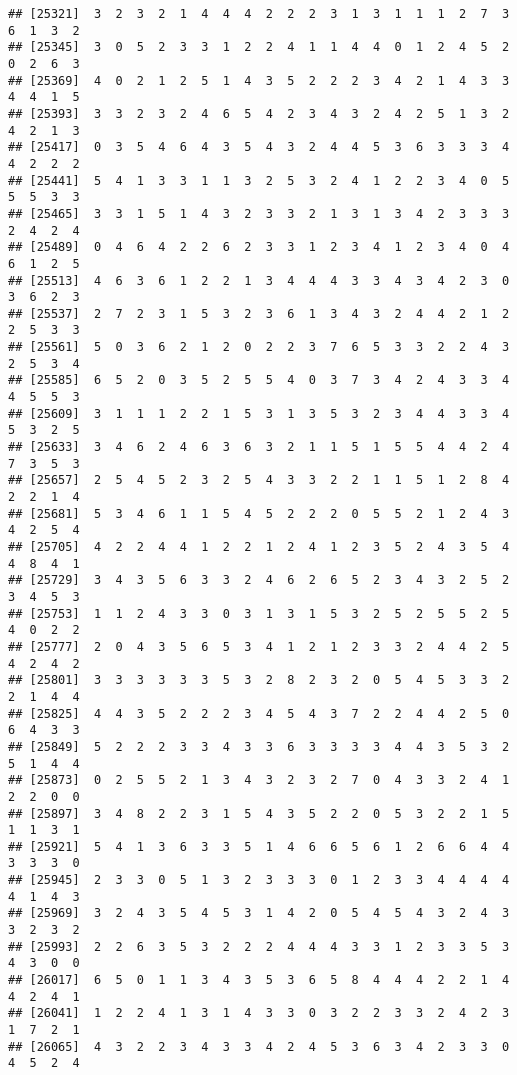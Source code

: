 \documentclass[
]{article}
\begin{document}
\begin{verbatim}
## [25321]  3  2  3  2  1  4  4  4  2  2  2  3  1  3  1  1  1  2  7  3  6  1  3  2
## [25345]  3  0  5  2  3  3  1  2  2  4  1  1  4  4  0  1  2  4  5  2  0  2  6  3
## [25369]  4  0  2  1  2  5  1  4  3  5  2  2  2  3  4  2  1  4  3  3  4  4  1  5
## [25393]  3  3  2  3  2  4  6  5  4  2  3  4  3  2  4  2  5  1  3  2  4  2  1  3
## [25417]  0  3  5  4  6  4  3  5  4  3  2  4  4  5  3  6  3  3  3  4  4  2  2  2
## [25441]  5  4  1  3  3  1  1  3  2  5  3  2  4  1  2  2  3  4  0  5  5  5  3  3
## [25465]  3  3  1  5  1  4  3  2  3  3  2  1  3  1  3  4  2  3  3  3  2  4  2  4
## [25489]  0  4  6  4  2  2  6  2  3  3  1  2  3  4  1  2  3  4  0  4  6  1  2  5
## [25513]  4  6  3  6  1  2  2  1  3  4  4  4  3  3  4  3  4  2  3  0  3  6  2  3
## [25537]  2  7  2  3  1  5  3  2  3  6  1  3  4  3  2  4  4  2  1  2  2  5  3  3
## [25561]  5  0  3  6  2  1  2  0  2  2  3  7  6  5  3  3  2  2  4  3  2  5  3  4
## [25585]  6  5  2  0  3  5  2  5  5  4  0  3  7  3  4  2  4  3  3  4  4  5  5  3
## [25609]  3  1  1  1  2  2  1  5  3  1  3  5  3  2  3  4  4  3  3  4  5  3  2  5
## [25633]  3  4  6  2  4  6  3  6  3  2  1  1  5  1  5  5  4  4  2  4  7  3  5  3
## [25657]  2  5  4  5  2  3  2  5  4  3  3  2  2  1  1  5  1  2  8  4  2  2  1  4
## [25681]  5  3  4  6  1  1  5  4  5  2  2  2  0  5  5  2  1  2  4  3  4  2  5  4
## [25705]  4  2  2  4  4  1  2  2  1  2  4  1  2  3  5  2  4  3  5  4  4  8  4  1
## [25729]  3  4  3  5  6  3  3  2  4  6  2  6  5  2  3  4  3  2  5  2  3  4  5  3
## [25753]  1  1  2  4  3  3  0  3  1  3  1  5  3  2  5  2  5  5  2  5  4  0  2  2
## [25777]  2  0  4  3  5  6  5  3  4  1  2  1  2  3  3  2  4  4  2  5  4  2  4  2
## [25801]  3  3  3  3  3  3  5  3  2  8  2  3  2  0  5  4  5  3  3  2  2  1  4  4
## [25825]  4  4  3  5  2  2  2  3  4  5  4  3  7  2  2  4  4  2  5  0  6  4  3  3
## [25849]  5  2  2  2  3  3  4  3  3  6  3  3  3  3  4  4  3  5  3  2  5  1  4  4
## [25873]  0  2  5  5  2  1  3  4  3  2  3  2  7  0  4  3  3  2  4  1  2  2  0  0
## [25897]  3  4  8  2  2  3  1  5  4  3  5  2  2  0  5  3  2  2  1  5  1  1  3  1
## [25921]  5  4  1  3  6  3  3  5  1  4  6  6  5  6  1  2  6  6  4  4  3  3  3  0
## [25945]  2  3  3  0  5  1  3  2  3  3  3  0  1  2  3  3  4  4  4  4  4  1  4  3
## [25969]  3  2  4  3  5  4  5  3  1  4  2  0  5  4  5  4  3  2  4  3  3  2  3  2
## [25993]  2  2  6  3  5  3  2  2  2  4  4  4  3  3  1  2  3  3  5  3  4  3  0  0
## [26017]  6  5  0  1  1  3  4  3  5  3  6  5  8  4  4  4  2  2  1  4  4  2  4  1
## [26041]  1  2  2  4  1  3  1  4  3  3  0  3  2  2  3  3  2  4  2  3  1  7  2  1
## [26065]  4  3  2  2  3  4  3  3  4  2  4  5  3  6  3  4  2  3  3  0  4  5  2  4

\end{verbatim}
\end{document}
